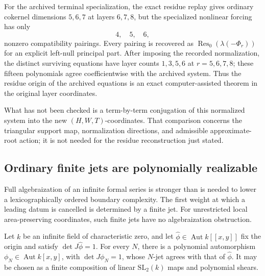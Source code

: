 \begin{remark}
\label{rem:828-structural-prediction}
For the archived terminal specialization, the exact residue replay gives
ordinary cokernel dimensions \(5,6,7\) at layers \(6,7,8\), but the
specialized nonlinear forcing has only
\[
4,\quad5,\quad6,
\]
nonzero compatibility pairings.  Every pairing is recovered as
\(\operatorname{Res}_0(\lambda(-\Phi_r))\) for an explicit left-null
principal part.  After imposing the recorded normalization, the distinct
surviving equations have layer counts \(1,3,5,6\) at \(r=5,6,7,8\);
these fifteen polynomials agree coefficientwise with the archived system.
Thus the residue origin of the archived equations is an exact
computer-assisted theorem in the original layer coordinates.

What has not been checked is a term-by-term conjugation of this normalized
system into the new \((H,W,T)\)-coordinates.  That comparison concerns the
triangular support map, normalization directions, and admissible
approximate-root action; it is not needed for the residue reconstruction
just stated.
\end{remark}

\subsection{Ordinary finite jets are polynomially realizable}

Full algebraization of an infinite formal series is stronger than is needed
to lower a lexicographically ordered boundary complexity.  The first
weight at which a leading datum is cancelled is determined by a finite jet.
For unrestricted local area-preserving coordinates, such finite jets have
no algebraization obstruction.

\begin{proposition}
\label{prop:finite-jet-realization}
Let \(k\) be an infinite field of characteristic zero, and let
\(\widehat\phi\in\operatorname{Aut}k[[x,y]]\) fix the origin and satisfy
\(\det J\widehat\phi=1\).  For every \(N\), there is a polynomial
automorphism \(\phi_N\in\operatorname{Aut}k[x,y]\), with
\(\det J\phi_N=1\), whose \(N\)-jet agrees with that of
\(\widehat\phi\).  It may be chosen as a finite composition of linear
\(\mathrm{SL}_2(k)\) maps and polynomial shears.
\end{proposition}

